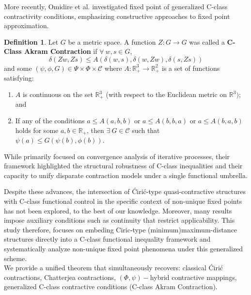 \documentclass[11pt,reqno]{amsart}
\theoremstyle{definition}
\newtheorem{definition}[theorem]{Definition}
\theoremstyle{remark}
\numberwithin{equation}{section}
\begin{document}
	More recently, Omidire et al. \cite{Omidire2025} investigated fixed point of generalized C-class contractivity conditions, emphasizing constructive approaches to fixed point approximation.
	\begin{definition}\cite{Omidire2025}
		\label{def:3.1} Let $G$ be a metric space. A function $Z:G\rightarrow G$
		was called a \textbf{C-Class Akram Contraction} if $\forall ~w,s\in G$, 
		\begin{equation}
			\delta(Zw,Zs)\leq A(\delta(w,s),\delta(w,Zw),\delta(s,Zs))  \label{eqn1.7}
		\end{equation}%
		and some $(\psi ,\phi ,G)\in \Psi \times \Phi \times \mathcal{C}$ where $A:%
		\mathbb{R}_{+}^{3}\rightarrow \mathbb{R}^2_{+}$ is a set of functions
		satisfying:
		
		\begin{enumerate}
			\item $A$ is continuous on the set $\mathbb{R}_{+}^{3}$ (with respect to the
			Euclidean metric on $\mathbb{R}^{3});$ and
			
			\item If any of the conditions $a\leq A(a,b,b)$ or $a\leq A(b,b,a)$ or $%
			a\leq A(b,a,b)$ holds for some $a,b\in \mathbb{R}_{+}$, then $\exists ~G\in 
			\mathcal{C}$ such that $\psi (a)\leq G(\psi (b),\phi (b))$.
		\end{enumerate}
	\end{definition}
	While primarily focused on convergence analysis of iterative processes, their framework highlighted the structural robustness of C-class inequalities and their capacity to unify disparate contraction models under a single functional umbrella.
	
	Despite these advances, the intersection of Ćirić-type quasi-contractive structures with C-class functional control in the specific context of non-unique fixed points has not been explored, to the best of our knowledge. Moreover, many results impose auxiliary conditions such as continuity that restrict applicability.
	This study therefore, focuses on embeding Ciric-type (minimum)maximum-distance structures directly into a C-class functional inequality framework and systematically analyze non-unique fixed point phenomena under this generalized scheme.\\
	We provide a unified theorem that simultaneously recovers: classical Ćirić contractions, Chatterjea contractions, $(\Phi,\psi)-$hybrid contractive mappings, generalized C-class contractive conditions (C-class Akram Contraction).
	
\end{document}
